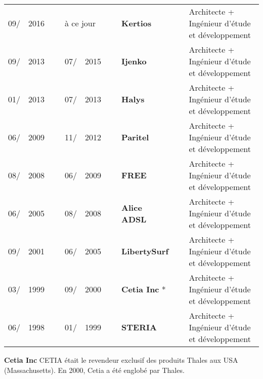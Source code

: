 \documentclass{cv}
\newlength{\interSectionTitleContentLength}
\newenvironment{sectionContent}{
   \vspace{\interSectionTitleContentLength}\par%
}{%
   \par%
}%
\newenvironment{packed_tabular}{
   \setlength{\tabcolsep}{0pt}
}{}
\newcommand{\cpname}[1]{%
  \textbf{#1}%
}
\begin{document}
   \begin{sectionContent}
      \begin{packed_tabular}
         \begin{tabular}{lclclclll}
            09/ & 2016 & ~ & \multicolumn{2}{l}{à ce jour} & ~ & \cpname{Kertios}     & ~ &%
                Architecte + Ingénieur d'étude et développement \\
            09/ & 2013 & ~ & 07/ & 2015                    & ~ & \cpname{Ijenko}      & ~ &%
                Architecte + Ingénieur d'étude et développement \\
            01/ & 2013 & ~ & 07/ & 2013                    & ~ & \cpname{Halys}       & ~ &%
                Architecte + Ingénieur d'étude et développement \\
            06/ & 2009 & ~ & 11/ & 2012                    & ~ & \cpname{Paritel}     & ~ &%
                Architecte + Ingénieur d'étude et développement \\
            08/ & 2008 & ~ & 06/ & 2009                    & ~ & \cpname{FREE}        & ~ &%
                Architecte + Ingénieur d'étude et développement \\
            06/ & 2005 & ~ & 08/ & 2008                    & ~ & \cpname{Alice ADSL}  & ~ &%
                Architecte + Ingénieur d'étude et développement \\
            09/ & 2001 & ~ & 06/ & 2005                    & ~ & \cpname{LibertySurf} & ~ &%
                Architecte + Ingénieur d'étude et développement \\
            03/ & 1999 & ~ & 09/ & 2000                    & ~ & \cpname{Cetia Inc}*  & ~ &%
                Architecte + Ingénieur d'étude et développement \\
            06/ & 1998 & ~ & 01/ & 1999                    & ~ & \cpname{STERIA}      & ~ &%
                Architecte + Ingénieur d'étude et développement \\
         \end{tabular}%
      \end{packed_tabular}%
   
      \vspace{10pt}
   
      \cpname{Cetia Inc} CETIA était le revendeur exclusif des produits Thales aux USA (Massachusetts). En 2000, Cetia a été englobé par Thales.
   \end{sectionContent}

\end{document}
